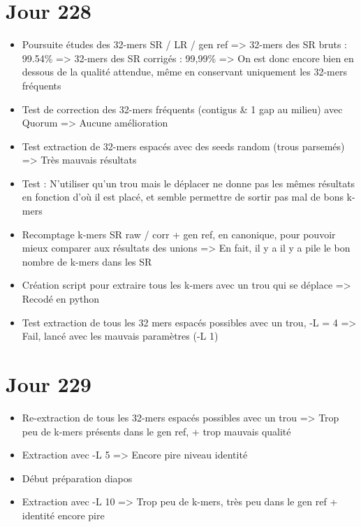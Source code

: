 \documentclass[12pt]{report}
\begin{document}
\section{Jour 228}

\begin{itemize}
	\item Poursuite études des 32-mers SR / LR / gen ref
		  => 32-mers des SR bruts : 99.54\%
		  => 32-mers des SR corrigés : 99,99\%
		  => On est donc encore bien en dessous de la qualité attendue, même en conservant uniquement les 32-mers fréquents
		  
	\item Test de correction des 32-mers fréquents (contigus & 1 gap au milieu) avec Quorum => Aucune amélioration
	
	\item Test extraction de 32-mers espacés avec des seeds random (trous parsemés) => Très mauvais résultats
	
	\item Test : N'utiliser qu'un trou mais le déplacer ne donne pas les mêmes résultats en fonction d'où il est placé,
		  et semble permettre de sortir pas mal de bons k-mers
	
	\item Recomptage k-mers SR raw / corr + gen ref, en canonique, pour pouvoir mieux comparer aux résultats des unions
		  => En fait, il y a il y a pile le bon nombre de k-mers dans les SR
	
	\item Création script pour extraire tous les k-mers avec un trou qui se déplace => Recodé en python
	
	\item Test extraction de tous les 32 mers espacés possibles avec un trou, -L = 4 => Fail, lancé avec les mauvais paramètres (-L 1)
\end{itemize}

\section{Jour 229}

\begin{itemize}
	\item Re-extraction de tous les 32-mers espacés possibles avec un trou => Trop peu de k-mers présents dans le gen ref,
		  + trop mauvais qualité
		  
	\item Extraction avec -L 5 => Encore pire niveau identité 
	
	\item Début préparation diapos
	
	\item Extraction avec -L 10 => Trop peu de k-mers, très peu dans le gen ref + identité encore pire
\end{itemize}
\end{document}
